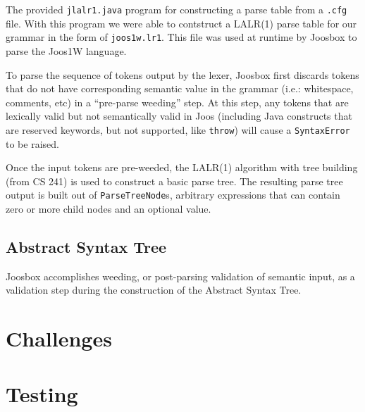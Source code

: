 \documentclass[letterpaper]{article}
\begin{document}
  The provided {\tt jlalr1.java} program for constructing a parse table from a
  {\tt .cfg} file. With this program we were able to contstruct a LALR(1) parse
  table for our grammar in the form of {\tt joos1w.lr1}. This file was used at
  runtime by Joosbox to parse the Joos1W language.

  To parse the sequence of tokens output by the lexer, Joosbox first discards
  tokens that do not have corresponding semantic value in the grammar (i.e.:
  whitespace, comments, etc) in a ``pre-parse weeding'' step. At this step,
  any tokens that are lexically valid but not semantically valid in Joos
  (including Java constructs that are reserved keywords, but not supported,
  like {\tt throw}) will cause a {\tt SyntaxError} to be raised.

  Once the input tokens are pre-weeded, the LALR(1) algorithm with tree building
  (from CS 241) is used to construct a basic parse tree. The resulting parse 
  tree output is built out of {\tt ParseTreeNode}s, arbitrary expressions
  that can contain zero or more child nodes and an optional value.

  \subsection{Abstract Syntax Tree}

  Joosbox accomplishes weeding, or post-parsing validation of semantic input,
  as a validation step during the construction of the Abstract Syntax Tree.

  \section{Challenges}


  \section{Testing}

\end{document}
